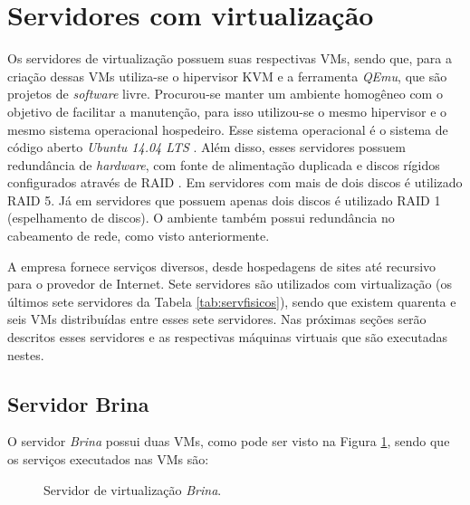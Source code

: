 \section{Servidores com virtualização}
\label{section:servvirt}

Os servidores de virtualização possuem suas respectivas \acp{VM}, sendo que, para a criação dessas \acp{VM} utiliza-se o hipervisor \ac{KVM} 
\cite{kvm} e a ferramenta \textit{QEmu}, que são projetos de \textit{software} livre. Procurou-se manter um ambiente homogêneo com o objetivo de 
facilitar a manutenção, para isso utilizou-se o mesmo hipervisor e o mesmo sistema operacional hospedeiro. Esse sistema operacional é o sistema 
de código aberto \textit{Ubuntu 14.04 \ac{LTS}} \cite{ubuntu}. Além disso, esses servidores possuem redundância de \textit{hardware}, com fonte 
de alimentação duplicada e discos rígidos configurados através de \ac{RAID} \cite{tanenbaum2009sistemas}. Em servidores com mais de dois discos é
utilizado \ac{RAID} 5. Já em servidores que possuem apenas dois discos é utilizado \ac{RAID} 1 (espelhamento de discos). 
O ambiente também possui redundância no cabeamento de rede, como visto anteriormente.

A empresa fornece serviços diversos, desde hospedagens de sites até  recursivo para o provedor de Internet. Sete servidores 
são utilizados com virtualização (os últimos sete servidores da Tabela \ref{tab:servfisicos}), sendo que existem quarenta e seis \acp{VM} 
distribuídas entre esses sete servidores. Nas próximas seções serão descritos esses servidores e as respectivas máquinas virtuais que são
executadas nestes.

\subsection{Servidor Brina}
\label{section:serv_brina}

O servidor \textit{Brina} possui duas \acp{VM}, como pode ser visto na Figura \ref{fig:servidor_brina}, sendo que os serviços executados nas 
\acp{VM} são:

\begin{figure}[h!]
 \centering
 \caption{Servidor de virtualização \textit{Brina}.}
 \label{fig:servidor_brina}
\end{figure}

